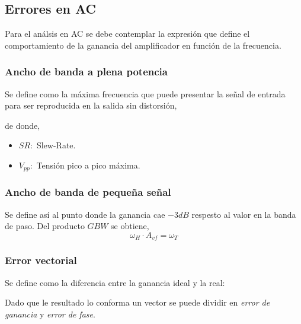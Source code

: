 \documentclass[11pt, a4paper]{article}
\begin{document}
\newpage

\subsection{Errores en AC}
\onehalfspacing
Para el análsis en AC se debe contemplar la expresión que define el comportamiento de la ganancia del amplificador en función de la frecuencia.
\begin{center}
\end{center}

\subsubsection{Ancho de banda a plena potencia}
\onehalfspacing
Se define como la máxima frecuencia que puede presentar la señal de entrada para ser reproducida en la salida sin distorsión,
\begin{center}
\end{center}
de donde,
\begin{itemize}
    \item $SR:$ Slew-Rate.
    \item $V_{pp}:$ Tensión pico a pico máxima.
\end{itemize}

\subsubsection{Ancho de banda de pequeña señal}
\onehalfspacing
Se define así al punto donde la ganancia cae $-3dB$ respesto al valor en la banda de paso. Del producto $GBW$ se obtiene,
\begin{equation}
   \nonumber
   \omega_H \cdot A_{vf} = \omega_T 
\end{equation}
\begin{center}
\end{center}

\subsubsection{Error vectorial}
\onehalfspacing
Se define como la diferencia entre la ganancia ideal y la real:
\begin{center}
\end{center}
Dado que le resultado lo conforma un vector se puede dividir en \textit{error de ganancia} y \textit{error de fase}.
\end{document}
